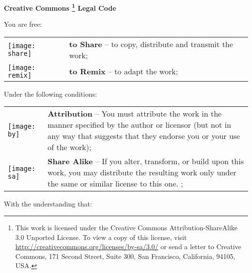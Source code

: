\begin{center} 
  \textbf{
    \LARGE{Creative Commons
      \footnote{This work is licensed
        under the Creative Commons Attribution-ShareAlike 3.0 Unported
        License. To view a copy of this license, visit
        \url{http://creativecommons.org/licenses/by-sa/3.0/} or send a
        letter to Creative Commons, 171 Second Street, Suite 300, San
        Francisco, California, 94105, USA.} Legal Code
    }
  }
\end{center}
\vspace{1cm}

\large You are free:
\normalsize

\begin{center}
  \begin{tabular}{p{1cm} p{12cm}}
    \texttt{[image: share]} & \textbf{to Share} -- 
    to copy, distribute and transmit the work;\\
    \texttt{[image: remix]} & \textbf{to Remix} -- 
    to adapt the work;\\
  \end{tabular}
\end{center}

\large Under the following conditions:
\normalsize

\begin{center}
  \begin{tabular}{p{1cm} p{12cm}}
    \texttt{[image: by]} & \textbf{Attribution} -- 
    You must attribute the work in the manner specified by the author 
    or licensor (but not in any way that suggests that they endorse you 
    or your use of the work);\\
    \texttt{[image: sa]} & \textbf{Share Alike} --  
    If you alter, transform, or build upon this work, 
    you may distribute the resulting work only under the same 
    or similar license to this one. ;\\
  \end{tabular}
\end{center}

\large With the understanding that:
\normalsize

